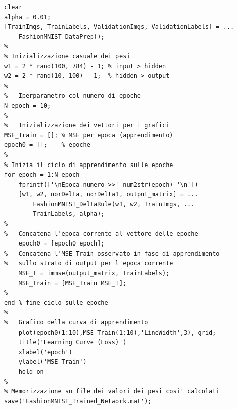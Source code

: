 \documentclass[a4paper,12pt]{article}
\begin{document}
\newpage
\begin{lstlisting}[style=Matlab-editor,title=\texttt{FashionMNIST\_Training.m},label=lst:training]
clear
alpha = 0.01;
[TrainImgs, TrainLabels, ValidationImgs, ValidationLabels] = ... 
    FashionMNIST_DataPrep();
%
% Inizializzazione casuale dei pesi
w1 = 2 * rand(100, 784) - 1; % input > hidden
w2 = 2 * rand(10, 100) - 1;  % hidden > output
%
%   Iperparametro col numero di epoche
N_epoch = 10;
%
%   Inizializzazione dei vettori per i grafici
MSE_Train = []; % MSE per epoca (apprendimento)
epoch0 = [];    % epoche
%
% Inizia il ciclo di apprendimento sulle epoche
for epoch = 1:N_epoch
    fprintf(['\nEpoca numero >>' num2str(epoch) '\n'])
    [w1, w2, norDelta, norDelta1, output_matrix] = ...
        FashionMNIST_DeltaRule(w1, w2, TrainImgs, ... 
        TrainLabels, alpha);
%
%   Concatena l'epoca corrente al vettore delle epoche
    epoch0 = [epoch0 epoch];
%   Concatena l'MSE_Train osservato in fase di apprendimento 
%   sullo strato di output per l'epoca corrente
    MSE_T = immse(output_matrix, TrainLabels);
    MSE_Train = [MSE_Train MSE_T];
%
end % fine ciclo sulle epoche
%
%   Grafico della curva di apprendimento 
    plot(epoch0(1:10),MSE_Train(1:10),'LineWidth',3), grid;
    title('Learning Curve (Loss)')
    xlabel('epoch')
    ylabel('MSE Train')
    hold on
%
% Memorizzazione su file dei valori dei pesi cosi' calcolati
save('FashionMNIST_Trained_Network.mat');
\end{lstlisting}
\end{document}
